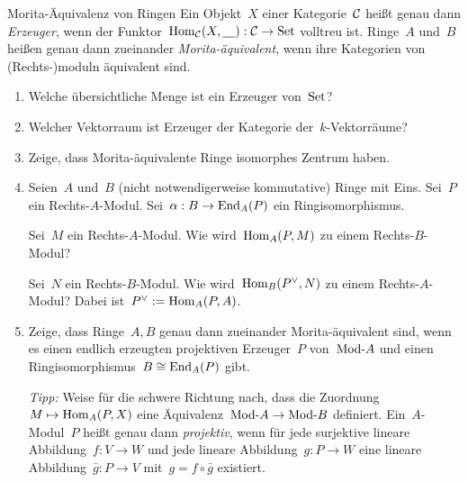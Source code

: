 \documentclass{uebblatt}
\begin{document}
\begin{aufgabe}{Morita-Äquivalenz von Ringen
}
Ein Objekt~$X$ einer Kategorie~$\mathcal{C}$ heißt genau dann \emph{Erzeuger}, wenn der
Funktor~$\mathrm{Hom}_{\mathcal{C}}(X, \underline{\quad}) : \mathcal{C} \to \mathrm{Set}$ volltreu ist. Ringe~$A$
und~$B$ heißen genau dann zueinander \emph{Morita-äquivalent}, wenn ihre
Kategorien von (Rechts-)moduln äquivalent sind.

\begin{enumerate}
\item Welche übersichtliche Menge ist ein Erzeuger von~$\mathrm{Set}$?
\item Welcher Vektorraum ist Erzeuger der Kategorie der~$k$-Vektorräume?
\item Zeige, dass Morita-äquivalente Ringe isomorphes Zentrum haben.
\item Seien~$A$ und~$B$ (nicht notwendigerweise kommutative) Ringe mit Eins.
Sei~$P$ ein Rechts-$A$-Modul. Sei~$\alpha : B \to \mathrm{End}_A(P)$ ein
Ringisomorphismus.

Sei~$M$ ein Rechts-$A$-Modul. Wie wird~$\mathrm{Hom}_A(P,M)$ zu einem Rechts-$B$-Modul?

Sei~$N$ ein Rechts-$B$-Modul. Wie wird~$\mathrm{Hom}_B(P^\vee,N)$ zu einem
Rechts-$A$-Modul? Dabei ist~$P^\vee := \mathrm{Hom}_A(P,A)$.

\item Zeige, dass Ringe~$A,B$ genau dann zueinander Morita-äquivalent sind,
wenn es einen endlich erzeugten projektiven Erzeuger~$P$ von~$\mathrm{Mod}\text{-}A$ und
einen Ringisomorphismus~$B \cong \mathrm{End}_A(P)$ gibt.

\emph{Tipp:} Weise für die schwere Richtung nach, dass die Zuordnung~$M \mapsto
\mathrm{Hom}_A(P,X)$ eine Äquivalenz~$\mathrm{Mod}\text{-}A \to \mathrm{Mod}\text{-}B$ definiert.
Ein~$A$-Modul~$P$ heißt genau dann \emph{projektiv}, wenn für jede surjektive lineare
Abbildung~$f : V \to W$ und jede lineare Abbildung~$g : P \to W$ eine lineare
Abbildung~$\bar g : P \to V$ mit~$g = f \circ \bar g$ existiert.
\end{enumerate}
\end{aufgabe}
\end{document}
